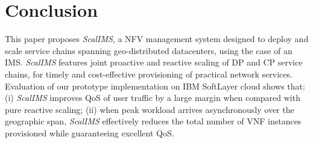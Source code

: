 \vspace{-1mm}
\section{Conclusion}

This paper proposes \textit{ScalIMS}, a NFV management system designed to deploy and scale service chains spanning geo-distributed datacenters, using the case of an IMS. \textit{ScalIMS} features joint proactive and reactive scaling of DP and CP service chains, for timely and cost-effective provisioning of practical network services. Evaluation of our prototype implementation on IBM SoftLayer cloud shows that: (i) \textit{ScalIMS} improves QoS of user traffic by a large margin when compared with pure reactive scaling; (ii) when peak workload arrives asynchronously over the geographic span, \textit{ScalIMS} effectively reduces the total number of VNF instances provisioned while guaranteeing excellent QoS. %

